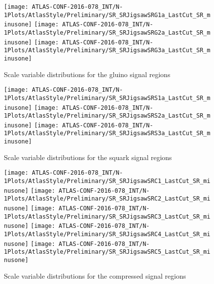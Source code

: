 \begin{figure}[tbp]
\begin{center}
\texttt{[image: ATLAS-CONF-2016-078\_INT/N-1Plots/AtlasStyle/Preliminary/SR\_SRJigsawSRG1a\_LastCut\_SR\_minusone]}
\texttt{[image: ATLAS-CONF-2016-078\_INT/N-1Plots/AtlasStyle/Preliminary/SR\_SRJigsawSRG2a\_LastCut\_SR\_minusone]}
\texttt{[image: ATLAS-CONF-2016-078\_INT/N-1Plots/AtlasStyle/Preliminary/SR\_SRJigsawSRG3a\_LastCut\_SR\_minusone]}
\end{center}
\caption{Scale variable distributions for the gluino signal regions}
\label{fig:srg_scale}
\end{figure}

\begin{figure}[tbp]
\begin{center}
\texttt{[image: ATLAS-CONF-2016-078\_INT/N-1Plots/AtlasStyle/Preliminary/SR\_SRJigsawSRS1a\_LastCut\_SR\_minusone]}
\texttt{[image: ATLAS-CONF-2016-078\_INT/N-1Plots/AtlasStyle/Preliminary/SR\_SRJigsawSRS2a\_LastCut\_SR\_minusone]}
\texttt{[image: ATLAS-CONF-2016-078\_INT/N-1Plots/AtlasStyle/Preliminary/SR\_SRJigsawSRS3a\_LastCut\_SR\_minusone]}
\end{center}
\caption{Scale variable distributions for the squark signal regions}
\label{fig:srs_scale}
\end{figure}

\begin{figure}[tbp]
\begin{center}
\texttt{[image: ATLAS-CONF-2016-078\_INT/N-1Plots/AtlasStyle/Preliminary/SR\_SRJigsawSRC1\_LastCut\_SR\_minusone]}
\texttt{[image: ATLAS-CONF-2016-078\_INT/N-1Plots/AtlasStyle/Preliminary/SR\_SRJigsawSRC2\_LastCut\_SR\_minusone]}
\texttt{[image: ATLAS-CONF-2016-078\_INT/N-1Plots/AtlasStyle/Preliminary/SR\_SRJigsawSRC3\_LastCut\_SR\_minusone]}
\texttt{[image: ATLAS-CONF-2016-078\_INT/N-1Plots/AtlasStyle/Preliminary/SR\_SRJigsawSRC4\_LastCut\_SR\_minusone]}
\texttt{[image: ATLAS-CONF-2016-078\_INT/N-1Plots/AtlasStyle/Preliminary/SR\_SRJigsawSRC5\_LastCut\_SR\_minusone]}
\end{center}
\caption{Scale variable distributions for the compressed signal regions}
\label{fig:src_scale}
\end{figure}
